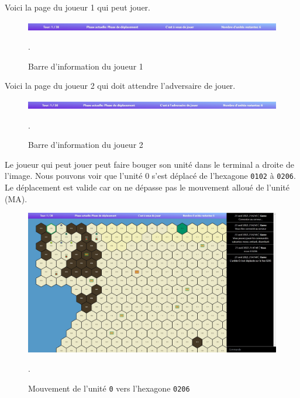 Voici la page du joueur 1 qui peut jouer.\\
\begin{figure}[H]
\centering
\includegraphics[scale=0.4]{data/player_1_acces.jpg}
\caption{Barre d'information du joueur 1}.
\end{figure}

Voici la page du joueur 2 qui doit attendre l'adversaire de jouer.\\
\begin{figure}[H]
\centering
\includegraphics[scale=0.35]{data/joueur_2.jpg}
\caption{Barre d'information du joueur 2}.
\end{figure}

Le joueur qui peut jouer peut faire bouger son unité dans le terminal a droite de l'image.
Nous pouvons voir que l'unité 0 s'est déplacé de l'hexagone \lstinline{0102} à \lstinline{0206}. Le déplacement est valide car on ne dépasse pas le mouvement alloué de l'unité (MA).\\

\begin{figure}[H]
\centering
\includegraphics[scale=0.35]{data/move_unit_player_1.jpg}
\caption{Mouvement de l'unité \lstinline{0} vers l'hexagone \lstinline{0206}}.
\end{figure}

